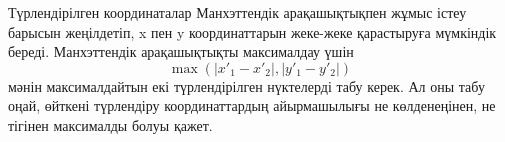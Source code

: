 Түрлендірілген координаталар Манхэттендік арақашықтықпен
жұмыс істеу барысын жеңілдетіп, x пен y координаттарын 
жеке-жеке қарастыруға мүмкіндік береді. Манхэттендік арақашықтықты
максималдау үшін  
\[\max(|x'_1-x'_2|,|y'_1-y'_2|)\]
мәнін максималдайтын екі түрлендірілген нүктелерді табу керек.
Ал оны табу оңай, өйткені түрлендіру координаттардың айырмашылығы 
не көлденеңінен, не тігінен
максималды болуы қажет. 

